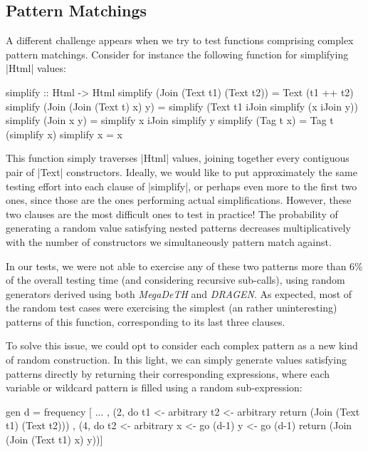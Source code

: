 %
\subsection{Pattern Matchings}

A different challenge appears when we try to test functions comprising complex
pattern matchings. Consider for instance the following function for simplifying
|Html| values:

\begin{code}
simplify :: Html -> Html
simplify (Join (Text t1) (Text t2)) = Text (t1 ++ t2)
simplify (Join (Join (Text t) x) y)
  = simplify (Text t1 iJoin simplify (x iJoin y))
simplify (Join x y) = simplify x iJoin simplify y
simplify (Tag t x) = Tag t (simplify x)
simplify x = x
\end{code}
%
This function simply traverses |Html| values, joining together every contiguous
pair of |Text| constructors.
%
Ideally, we would like to put approximately the same testing effort into each
clause of |simplify|, or perhaps even more to the first two ones, since those
are the ones performing actual simplifications.
%
However, these two clauses are the most difficult ones to test in practice!
%
The probability of generating a random value satisfying nested patterns
decreases multiplicatively with the number of constructors we simultaneously
pattern match against.


In our tests, we were not able to exercise any of these two patterns more than
6\% of the overall testing time (and considering recursive sub-calls), using
random generators derived using both \emph{MegaDeTH} and \emph{DRAGEN}.
%
As expected, most of the random test cases were exercising the simplest (an
rather uninteresting) patterns of this function, corresponding to its last three
clauses.


To solve this issue, we could opt to consider each complex pattern as a new kind
of random construction.
%
In this light, we can simply generate values satisfying patterns directly by
returning their corresponding expressions, where each variable or wildcard
pattern is filled using a random sub-expression:

\begin{code}
gen d = frequency
  [ ...
  , (2, do  t1  <- arbitrary
            t2  <- arbitrary
            return (Join (Text t1) (Text t2)))
  , (4, do  t2  <- arbitrary
            x   <- go (d-1)
            y   <- go (d-1)
            return (Join (Join (Text t1) x) y))]
\end{code}



